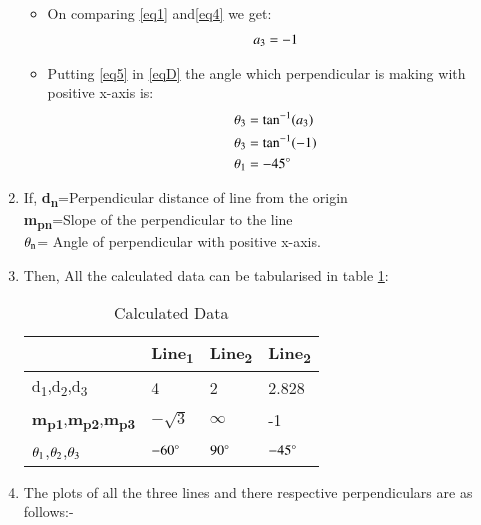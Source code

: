 \documentclass[journal,12pt,twocolumn]{IEEEtran}
\begin{document}
\begin{enumerate}
\begin{itemize}
\item On comparing \eqref{eq1} and\eqref{eq4} we get:
\begin{align}
 a\textsubscript{3}=-1  \label{eq5} 
\end{align}
\item Putting \eqref{eq5} in \eqref{eqD} the angle which perpendicular is making with positive x-axis is:
\begin{align}
    \theta\textsubscript{3} &= \tan^{-1}(  a\textsubscript{3})
    \\
    \theta\textsubscript{3} &=\tan^{-1}(-1)
    \\
 \theta\textsubscript{1} &= -45\degree
\end{align}
\end{itemize}
\item If,
\textbf{d\textsubscript{n}}=Perpendicular distance of line from the  origin
\\
\textbf{m\textsubscript{pn}}=Slope of the perpendicular to the line 
\\
$\theta\textsubscript{n}$= Angle of perpendicular with positive x-axis.
\item Then, All the calculated data can be tabularised in table  \ref{tab:table2}:

\begin{table}[!ht]
\begin{center}
\begin{tabular}{ | m{2cm} | m{1.2cm}| m{1.2cm} | m{1.2cm} |} 
\hline
 & Line\textsubscript{1} & Line\textsubscript{2} & Line\textsubscript{2} \\
\hline
d\textsubscript{1},d\textsubscript{2},d\textsubscript{3} & 4 & 2 & 2.828 \\ 
\hline
\textbf{m\textsubscript{p1}},\textbf{m\textsubscript{p2}},\textbf{m\textsubscript{p3}} & $-\sqrt{3}$ & $\infty$ & -1 \\ 
\hline
$\theta\textsubscript{1}$,$\theta\textsubscript{2}$,$\theta\textsubscript{3}$& $-60\degree$ & $90\degree$ & $-45\degree$ \\ 
\hline
\end{tabular}
\end{center}
\caption{Calculated Data}
\label{tab:table2}
\end{table}

\item The plots of all the three lines and there respective perpendiculars are as follows:-
    \\
\end{enumerate}
\end{document}
